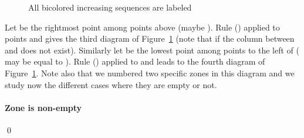 \documentclass[11pt]{article}
\newenvironment{pf}{{\em \noindent Proof:}}{ \hfill \qed\smallskip}
\newcommand{\rmnum}[1]{\romannumeral #1}
\begin{document}
\begin{pf}
\begin{figure}[H]
\begin{center}
\caption{All bicolored increasing sequences are labeled \label{fig:tikz2RG}}
\end{center}
\end{figure}


Let  be the rightmost point among points above  (maybe ). Rule (\rmnum{1}) applied to points  and  gives the third diagram of Figure~\ref{fig:tikz2RG} (note that if  the column between  and  does not exist).
Similarly let  be the lowest point among points to the left of  ( may be equal to ). Rule (\rmnum{2}) applied to  and  leads to the fourth diagram of Figure~\ref{fig:tikz2RG}. Note also that we numbered two specific zones in this diagram and we study now the different cases where they are empty or not.

\paragraph{Zone  is non-empty}


\end{pf}
\end{document}
